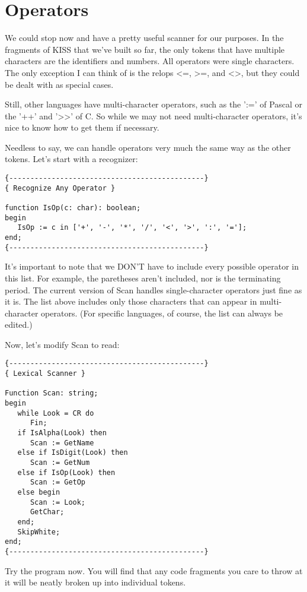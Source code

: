 \section{Operators}

We  could  stop now and have a  pretty  useful  scanner  for  our purposes. In the fragments of KISS that we've built so  far, the only tokens that have multiple characters are the identifiers and numbers. All  operators  were  single  characters. The  only exception I can think of is the relops <=, >=, and  <>, but they could be dealt with as special cases.

Still, other languages have  multi-character  operators, such as the ':=' of  Pascal or the '++' and '>>' of C. So  while  we may not need multi-character operators, it's  nice to know how to get them if necessary.

Needless to say, we  can  handle operators very much the same way as the other tokens. Let's start with a recognizer:

\begin{verbatim}
{----------------------------------------------}
{ Recognize Any Operator }

function IsOp(c: char): boolean;
begin
   IsOp := c in ['+', '-', '*', '/', '<', '>', ':', '='];
end;
{----------------------------------------------}
\end{verbatim}

It's important to  note  that  we  DON'T  have  to  include every possible  operator in this list. For  example, the paretheses aren't  included, nor is the terminating  period. The  current version of Scan handles single-character operators  just  fine as it is. The list above includes only those  characters  that  can appear in multi-character operators. (For specific languages, of course, the list can always be edited.)

Now, let's modify Scan to read:

\begin{verbatim}
{----------------------------------------------}
{ Lexical Scanner }

Function Scan: string;
begin
   while Look = CR do
      Fin;
   if IsAlpha(Look) then
      Scan := GetName
   else if IsDigit(Look) then
      Scan := GetNum
   else if IsOp(Look) then
      Scan := GetOp
   else begin
      Scan := Look;
      GetChar;
   end;
   SkipWhite;
end;
{----------------------------------------------}
\end{verbatim}

Try the program now. You  will  find that any code fragments you care  to throw at it will be neatly  broken  up  into  individual tokens.

